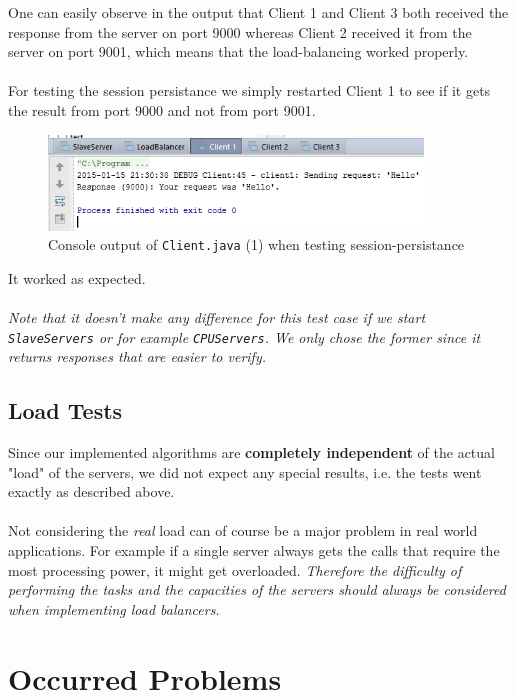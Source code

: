 \documentclass[11pt, a4paper]{article}
\begin{document}
One can easily observe in the output that Client 1 and Client 3 both received the response from the server on port 9000 whereas Client 2 received it from the server on port 9001, which means that the load-balancing worked properly.
\\\\
For testing the session persistance we simply restarted Client 1 to see if it gets the result from port 9000 and not from port 9001.

\begin{figure}[H]
	\centering
	\includegraphics[height=1in]{img/test-session_persistance}
	\caption{Console output of \lstinline|Client.java| (1) when testing session-persistance}
\end{figure}

It worked as expected.
\\\\
\textit{Note that it doesn't make any difference for this test case if we start \lstinline|SlaveServers| or for example \lstinline|CPUServers|. We only chose the former since it returns responses that are easier to verify.}

\subsection{Load Tests}

Since our implemented algorithms are \textbf{completely independent} of the actual "load" of the servers, we did not expect any special results, i.e. the tests went exactly as described above.
\\\\
Not considering the \textit{real} load can of course be a major problem in real world applications. For example if a single server always gets the calls that require the most processing power, it might get overloaded. \textit{Therefore the difficulty of performing the tasks and the capacities of the servers should always be considered when implementing load balancers.}

\section{Occurred Problems}
\end{document}
